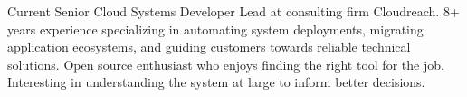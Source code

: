 
\begin{cvparagraph}

Current Senior Cloud Systems Developer Lead at consulting firm Cloudreach. 8+ years experience specializing in automating system deployments, migrating application ecosystems, and guiding customers towards reliable technical solutions. Open source enthusiast who enjoys finding the right tool for the job. Interesting in understanding the system at large to inform better decisions.
\end{cvparagraph}
